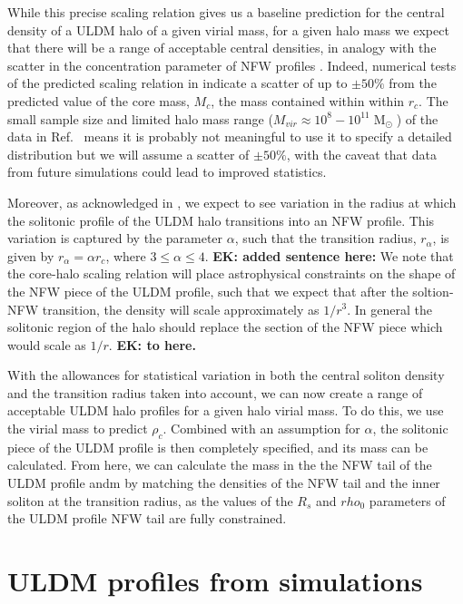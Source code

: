 \documentclass[a4paper,11pt]{article}
\newcommand{\ek}[1]{{{\bf \color{red} EK: #1}}}
\begin{document}
While this precise scaling relation gives us a baseline prediction for the central density of a ULDM halo of a given virial mass, for a given halo mass we expect that there will be a range of acceptable central densities, in analogy with the scatter in the concentration parameter of NFW profiles \cite{Maccio:2008pcd}. Indeed, numerical tests of the predicted scaling relation in \cite{Schive:2014hza} indicate a scatter of up to $\pm 50\%$ from the  predicted value of the core mass, $M_c$, the mass contained within  within $r_c$. The small sample size and limited halo mass range ($ M_{vir} \approx 10^8-10^{11} \operatorname{M}_{\odot}$)  of the data in Ref.~\cite{Schive:2014hza} means it is probably not meaningful to use it to specify a detailed distribution but we will assume a scatter of $\pm 50\%$, with the caveat that data from future simulations could lead to improved statistics.

Moreover, as acknowledged in \cite{Robles:2018fur}, we expect to see variation in the radius at which the solitonic profile of the ULDM halo transitions into an NFW profile. This variation is captured by the parameter $\alpha$, such that the transition radius, $r_{\alpha}$, is given by $r_{\alpha} = \alpha r_c$, where $3 \leq \alpha \leq 4$. \ek{added sentence here:} We note that the core-halo scaling relation will place astrophysical constraints on the shape of the NFW piece of the ULDM profile, such that we expect that after the soltion-NFW transition, the density will scale approximately as $1/r^3$. In general the solitonic region of the halo should replace the section of the NFW piece which would scale as $1/r$. \ek{to here.} 


With the allowances for statistical variation in both the central soliton density and the transition radius taken into account, we can now create a range of acceptable ULDM halo profiles for a given halo virial mass. To do this, we use the virial mass to predict $\rho_c$. Combined with an assumption for $\alpha$, the solitonic piece of the ULDM profile is then completely specified, and its mass can be calculated. From here, we can calculate the mass in the the NFW tail of the ULDM profile andm by matching the densities of the NFW tail and the inner soliton at the transition radius, as the values of the $R_s$ and $rho_0$ parameters of the ULDM profile NFW tail are fully constrained.  



\section{ULDM profiles from simulations}\label{sec:sim_comparison}
\end{document}
